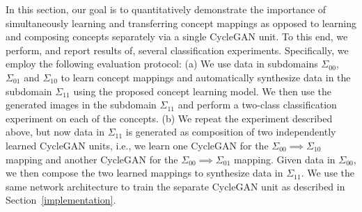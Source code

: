 \documentclass[10pt,twocolumn,letterpaper]{article}
\begin{document}
In this section, our goal is to quantitatively demonstrate the importance of simultaneously learning and transferring concept mappings as opposed to learning and composing concepts separately via a single CycleGAN unit. To this end, we perform, and report results of, several classification experiments. Specifically, we employ the following evaluation protocol: (a) We use data in subdomains $\Sigma_{00}$, $\Sigma_{01}$ and $\Sigma_{10}$ to learn concept mappings and automatically synthesize data in the subdomain $\Sigma_{11}$ using the proposed concept learning model. We then use the generated images in the subdomain $\Sigma_{11}$ and perform a two-class classification experiment on each of the concepts. (b) We repeat the experiment described above, but now data in $\Sigma_{11}$ is generated as composition of two independently learned CycleGAN units, i.e., we learn one CycleGAN for the $\Sigma_{00}\implies \Sigma_{10} $ mapping and another CycleGAN for the $\Sigma_{00}\implies \Sigma_{01} $ mapping. Given data in $\Sigma_{00}$, we then compose the two learned mappings to synthesize data in $\Sigma_{11}$. We use the same network architecture to train the separate CycleGAN unit as described in Section~\ref{implementation}.




\begin{table}
\centering
\setlength{\tabcolsep}{3pt}
\caption{The accuracy (\%) of classifying ``edge/shoe" images synthesized via ConceptGAN (ours) vs. CycleGAN~\cite{CycleGAN}. Joint classification accuracy is reported as the percentage of the images correctly classified in two tests at the same time. %
}
\label{tab:res1}
\end{table}
\end{document}
